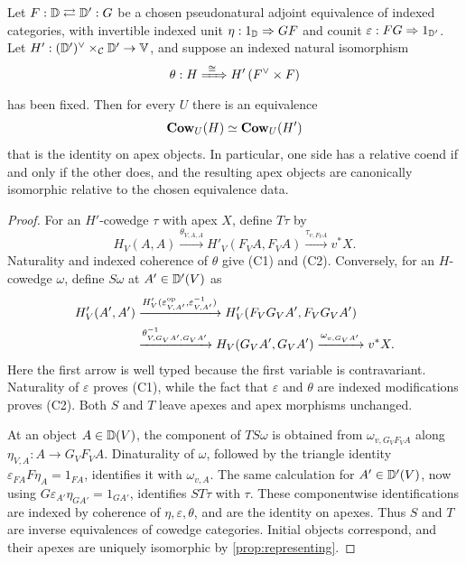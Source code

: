 \begin{proposition}
\label{prop:indexed-equivalence}
Let \(F:\mathbb{D}\rightleftarrows\mathbb{D}':G\) be a chosen pseudonatural adjoint
equivalence of indexed categories, with invertible indexed unit
\(\eta:1_{\mathbb{D}}\Rightarrow GF\) and counit
\(\varepsilon:FG\Rightarrow1_{\mathbb{D}'}\).  Let
\(H':(\mathbb{D}')^{\vee}\times_{\mathcal{C}}\mathbb{D}'\to\mathbb{V}\), and suppose an indexed natural
isomorphism
\[
  \theta:H\xRightarrow{\ \cong\ }H'\,(F^{\vee}\times F)
\]
has been fixed.  Then for every \(U\) there is an equivalence
\[
  \mathbf{Cow}_U(H)\simeq\mathbf{Cow}_U(H')
\]
that is the identity on apex objects.  In particular, one side has a relative
coend if and only if the other does, and the resulting apex objects are
canonically isomorphic relative to the chosen equivalence data.
\end{proposition}

\begin{proof}
For an \(H'\)-cowedge \(\tau\) with apex \(X\), define \(T\tau\) by
\begin{equation}
  H_V(A,A)\xrightarrow{\theta_{V,A,A}}
  H'_V(F_VA,F_VA)\xrightarrow{\tau_{v,F_VA}}v^*X.
  \label{eq:equivalence-forward}
\end{equation}
Naturality and indexed coherence of \(\theta\) give (C1) and (C2).
Conversely, for an \(H\)-cowedge \(\omega\), define \(S\omega\) at
\(A'\in\mathbb{D}'(V)\) as
\begin{equation}
\begin{split}
  H'_V(A',A')
  &\xrightarrow{H'_V(\varepsilon_{V,A'}^{\mathrm{op}},
                         \varepsilon_{V,A'}^{-1})}
    H'_V(F_VG_VA',F_VG_VA')\\
  &\xrightarrow{\theta^{-1}_{V,G_VA',G_VA'}}
    H_V(G_VA',G_VA')
  \xrightarrow{\omega_{v,G_VA'}}v^*X.
\end{split}
\label{eq:equivalence-backward}
\end{equation}
Here the first arrow is well typed because the first variable is
contravariant.  Naturality of \(\varepsilon\) proves (C1), while the fact
that \(\varepsilon\) and \(\theta\) are indexed modifications proves (C2).
Both \(S\) and \(T\) leave apexes and apex morphisms unchanged.

At an object \(A\in\mathbb{D}(V)\), the component of \(TS\omega\) is obtained from
\(\omega_{v,G_VF_VA}\) along \(\eta_{V,A}:A\to G_VF_VA\).  Dinaturality of
\(\omega\), followed by the triangle identity
\(\varepsilon_{F A}F\eta_A=1_{F A}\), identifies it with
\(\omega_{v,A}\).  The same calculation for \(A'\in\mathbb{D}'(V)\), now using
\(G\varepsilon_{A'}\eta_{G A'}=1_{G A'}\), identifies \(ST\tau\) with
\(\tau\).  These componentwise identifications are indexed by coherence of
\(\eta,\varepsilon,\theta\), and are the identity on apexes.  Thus \(S\)
and \(T\) are inverse equivalences of cowedge categories.  Initial objects
correspond, and their apexes are uniquely isomorphic by
\cref{prop:representing}.
\end{proof}

